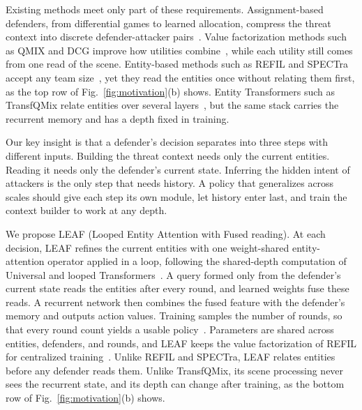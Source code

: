 Existing methods meet only part of these requirements. Assignment-based defenders, from differential games to learned allocation, compress the threat context into discrete defender-attacker pairs~\cite{chen2017reachavoid,garcia2021mpme,iqbal2022alma,wu2025swarm}. Value factorization methods such as QMIX and DCG improve how utilities combine~\cite{rashid2018qmix,boehmer2020dcg}, while each utility still comes from one read of the scene. Entity-based methods such as REFIL and SPECTra accept any team size~\cite{iqbal2021refil,park2026spectra}, yet they read the entities once without relating them first, as the top row of Fig.~\ref{fig:motivation}(b) shows. Entity Transformers such as TransfQMix relate entities over several layers~\cite{hu2021updet,transfqmix2023}, but the same stack carries the recurrent memory and has a depth fixed in training.

Our key insight is that a defender's decision separates into three steps with different inputs. Building the threat context needs only the current entities. Reading it needs only the defender's current state. Inferring the hidden intent of attackers is the only step that needs history. A policy that generalizes across scales should give each step its own module, let history enter last, and train the context builder to work at any depth.

We propose LEAF (Looped Entity Attention with Fused reading). At each decision, LEAF refines the current entities with one weight-shared entity-attention operator applied in a loop, following the shared-depth computation of Universal and looped Transformers~\cite{dehghani2019universal,giannou2023looped}. A query formed only from the defender's current state reads the entities after every round, and learned weights fuse these reads. A recurrent network then combines the fused feature with the defender's memory and outputs action values. Training samples the number of rounds, so that every round count yields a usable policy~\cite{fan2020layerdrop}. Parameters are shared across entities, defenders, and rounds, and LEAF keeps the value factorization of REFIL for centralized training~\cite{iqbal2021refil}. Unlike REFIL and SPECTra, LEAF relates entities before any defender reads them. Unlike TransfQMix, its scene processing never sees the recurrent state, and its depth can change after training, as the bottom row of Fig.~\ref{fig:motivation}(b) shows.

